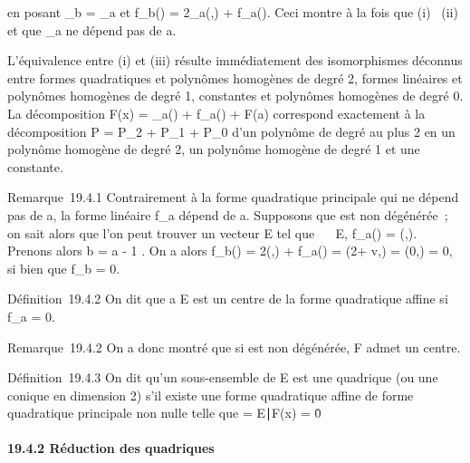 \documentclass[]{article}
\begin{document}
en posant \Phi\_b = \Phi\_a et
f\_b(\overrightarrow\xi) =
2\phi\_a(\overrightarrowab,\overrightarrow\xi)
+ f\_a(\overrightarrow\xi). Ceci montre à la
fois que (i) \rigtharrow~(ii) et que \Phi\_a ne dépend pas de a.

L'équivalence entre (i) et (iii) résulte immédiatement des isomorphismes
dé connus entre formes quadratiques et polynômes homogènes de degré 2,
formes linéaires et polynômes homogènes de degré 1, constantes et
polynômes homogènes de degré 0. La décomposition F(x) =
\Phi\_a(\overrightarrowax) +
f\_a(\overrightarrowax) + F(a) correspond
exactement à la décomposition P = P\_2 + P\_1 +
P\_0 d'un polynôme de degré au plus 2 en un polynôme homogène de
degré 2, un polynôme homogène de degré 1 et une constante.

Remarque~19.4.1 Contrairement à la forme quadratique principale \Phi qui ne
dépend pas de a, la forme linéaire f\_a dépend de a. Supposons
que \Phi est non dégénérée~; on sait alors que l'on peut trouver un vecteur
\vecv \in\vec E tel que
\forall~\vec\xi~
\in\vec E, f\_a(\vec\xi) =
\phi(\vecv,\vec\xi). Prenons alors b =
a - 1  \vecv. On a alors
f\_b(\vec\xi) =
2\phi(\overrightarrowab,\vec\xi) +
f\_a(\vec\xi) =
\phi(2\overrightarrowab +\vec
v,\vec\xi) = \phi(0,\vec\xi) = 0, si
bien que f\_b = 0.

Définition~19.4.2 On dit que a \in E est un centre de la forme quadratique
affine si f\_a = 0.

Remarque~19.4.2 On a donc montré que si \Phi est non dégénérée, F admet un
centre.

Définition~19.4.3 On dit qu'un sous-ensemble \Sigma de E est une quadrique
(ou une conique en dimension 2) s'il existe une forme quadratique affine
de forme quadratique principale non nulle telle que \Sigma =
\x \in E∣F(x) =
0\.

\paragraph{19.4.2 Réduction des quadriques}
\end{document}
